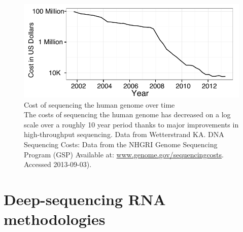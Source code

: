 \begin{figure}[htbp]
	\centering 
	\includegraphics{Figures/Sequencing_costs_over_time.pdf}
	\caption[Cost of sequencing the human genome over time]
	{
		Cost of sequencing the human genome over time\\[0.25cm]
		The costs of sequencing the human genome has decreased on a log scale over a roughly 10 year period thanks 
		to major improvements in high-throughput sequencing. Data from Wetterstrand KA. DNA Sequencing Costs: 
		Data from the NHGRI Genome Sequencing Program (GSP) Available at: \url{www.genome.gov/sequencingcosts}. Accessed 2013-09-03).
	}
	\label{fig:SeqCosts}
\end{figure}

\section{Deep-sequencing RNA methodologies}




